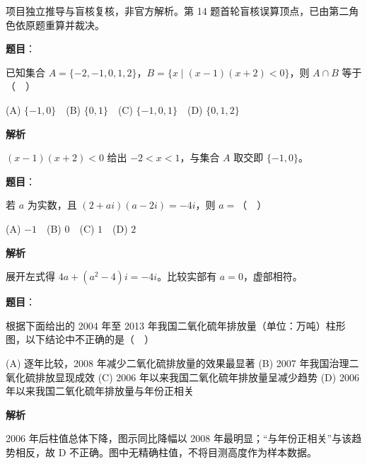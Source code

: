 

\begin{gktip}
项目独立推导与盲核复核，非官方解析。第 14 题首轮盲核误算顶点，已由第二角色依原题重算并裁决。
\end{gktip}

\begin{answer}

\textbf{题目}：

已知集合 $A=\{-2,-1,0,1,2\}$，$B=\{x\mid (x-1)(x+2)<0\}$，则 $A\cap B$ 等于（　）

(A) $\{-1,0\}$　(B) $\{0,1\}$　(C) $\{-1,0,1\}$　(D) $\{0,1,2\}$

\textbf{解析}

$(x-1)(x+2)<0$ 给出 $-2<x<1$，与集合 $A$ 取交即 $\{-1,0\}$。


\end{answer}
\begin{answer}

\textbf{题目}：

若 $a$ 为实数，且 $(2+ai)(a-2i)=-4i$，则 $a=$（　）

(A) $-1$　(B) $0$　(C) $1$　(D) $2$

\textbf{解析}

展开左式得 $4a+(a^2-4)i=-4i$。比较实部有 $a=0$，虚部相符。


\end{answer}
\begin{answer}

\textbf{题目}：

根据下面给出的 2004 年至 2013 年我国二氧化硫年排放量（单位：万吨）柱形图，以下结论中不正确的是（　）
\nopagebreak[4]
\begin{center}\end{center}
\nopagebreak[4]
(A) 逐年比较，2008 年减少二氧化硫排放量的效果最显著  
(B) 2007 年我国治理二氧化硫排放显现成效  
(C) 2006 年以来我国二氧化硫年排放量呈减少趋势  
(D) 2006 年以来我国二氧化硫年排放量与年份正相关

\textbf{解析}

2006 年后柱值总体下降，图示同比降幅以 2008 年最明显；“与年份正相关”与该趋势相反，故 D 不正确。图中无精确柱值，不将目测高度作为样本数据。


\end{answer}
